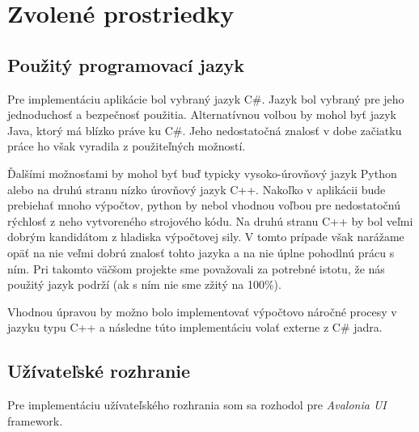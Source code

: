 \pagebreak

\section{Zvolené prostriedky}

\subsection{Použitý programovací jazyk}

Pre implementáciu aplikácie bol vybraný jazyk C\#. Jazyk bol vybraný pre jeho jednoduchosť a bezpečnosť použitia. Alternatívnou volbou by mohol byť jazyk Java, ktorý má blízko práve ku C\#. Jeho nedostatočná znalosť v dobe začiatku práce ho však vyradila z použiteľných možností. 

Ďalšími možnosťami by mohol byť buď typicky vysoko-úrovňový jazyk Python alebo na druhú stranu nízko úrovňový jazyk C++. Nakoľko v aplikácii bude prebiehať mnoho výpočtov, python by nebol vhodnou voľbou pre nedostatočnú rýchlosť z neho vytvoreného strojového kódu. Na druhú stranu C++ by bol veľmi dobrým kandidátom z hladiska výpočtovej sily. V tomto prípade však narážame opäť na nie veľmi dobrú znalosť tohto jazyka a na nie úplne pohodlnú prácu s ním. Pri takomto väčšom projekte sme považovali za potrebné istotu, že nás použitý jazyk podrží (ak s ním nie sme zžitý na 100\%). 

Vhodnou úpravou by možno bolo implementovať výpočtovo náročné procesy v jazyku typu C++ a následne túto implementáciu volať externe z C\# jadra.     

\subsection{Užívateľské rozhranie}

Pre implementáciu užívateľského rozhrania som sa rozhodol pre \textit{Avalonia UI} framework. 

